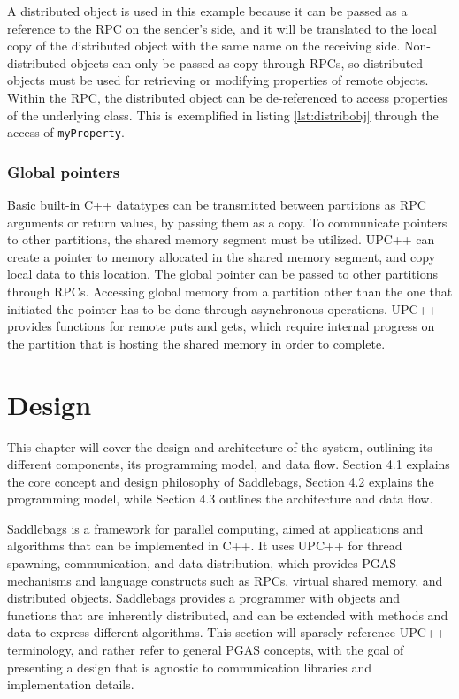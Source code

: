 \documentclass{uit-report}
\begin{document}
A distributed object is used in this example because it can be passed as a reference to the RPC on the sender's side, and it will be translated to the local copy of the distributed object with the same name on the receiving side. Non-distributed objects can only be passed as copy through RPCs, so distributed objects must be used for retrieving or modifying properties of remote objects. Within the RPC, the distributed object can be de-referenced to access properties of the underlying class. This is exemplified in listing \ref{lst:distribobj} through the access of \texttt{myProperty}.


\subsection{Global pointers} \label{section:globalpointers}
Basic built-in C++ datatypes can be transmitted between partitions as RPC arguments or return values, by passing them as a copy. To communicate pointers to other partitions, the shared memory segment must be utilized. UPC++ can create a pointer to memory allocated in the shared memory segment, and copy local data to this location. The global pointer can be passed to other partitions through RPCs. Accessing global memory from a partition other than the one that initiated the pointer has to be done through asynchronous operations. UPC++ provides functions for remote puts and gets, which require internal progress on the partition that is hosting the shared memory in order to complete.


\newpage
\mbox{} \pagebreak
\chapter{Design} \label{chapter:design}
This chapter will cover the design and architecture of the system, outlining its different components, its programming model, and data flow. Section 4.1 explains the core concept and design philosophy of Saddlebags, Section 4.2 explains the programming model, while Section 4.3 outlines the architecture and data flow.

Saddlebags is a framework for parallel computing, aimed at applications and algorithms that can be implemented in C++. It uses UPC++ for thread spawning, communication, and data distribution, which provides PGAS mechanisms and language constructs such as RPCs, virtual shared memory, and distributed objects. Saddlebags provides a programmer with objects and functions that are inherently distributed, and can be extended with methods and data to express different algorithms. This section will sparsely reference UPC++ terminology, and rather refer to general PGAS concepts, with the goal of presenting a design that is agnostic to communication libraries and implementation details.
\end{document}
